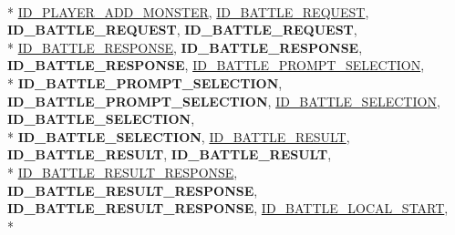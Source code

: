 \begin{DoxyCompactItemize}
\\*
\hyperlink{namespace_champ_net_plugin_a2ade5cfa7cf6c25ab7236c6b54a57821ad42c079bb7459dbaf419eeb2e845f3e2}{I\-D\-\_\-\-P\-L\-A\-Y\-E\-R\-\_\-\-A\-D\-D\-\_\-\-M\-O\-N\-S\-T\-E\-R}, 
\hyperlink{namespace_champ_net_plugin_a2ade5cfa7cf6c25ab7236c6b54a57821a1099c58a5b9ad43616e67c5865ce539a}{I\-D\-\_\-\-B\-A\-T\-T\-L\-E\-\_\-\-R\-E\-Q\-U\-E\-S\-T}, 
{\bfseries I\-D\-\_\-\-B\-A\-T\-T\-L\-E\-\_\-\-R\-E\-Q\-U\-E\-S\-T}, 
{\bfseries I\-D\-\_\-\-B\-A\-T\-T\-L\-E\-\_\-\-R\-E\-Q\-U\-E\-S\-T}, 
\\*
\hyperlink{namespace_champ_net_plugin_a2ade5cfa7cf6c25ab7236c6b54a57821a4d61a30352b41b284f20eeb6d46d0b18}{I\-D\-\_\-\-B\-A\-T\-T\-L\-E\-\_\-\-R\-E\-S\-P\-O\-N\-S\-E}, 
{\bfseries I\-D\-\_\-\-B\-A\-T\-T\-L\-E\-\_\-\-R\-E\-S\-P\-O\-N\-S\-E}, 
{\bfseries I\-D\-\_\-\-B\-A\-T\-T\-L\-E\-\_\-\-R\-E\-S\-P\-O\-N\-S\-E}, 
\hyperlink{namespace_champ_net_plugin_a2ade5cfa7cf6c25ab7236c6b54a57821a1ce06c939b64517c251a1cc36168837f}{I\-D\-\_\-\-B\-A\-T\-T\-L\-E\-\_\-\-P\-R\-O\-M\-P\-T\-\_\-\-S\-E\-L\-E\-C\-T\-I\-O\-N}, 
\\*
{\bfseries I\-D\-\_\-\-B\-A\-T\-T\-L\-E\-\_\-\-P\-R\-O\-M\-P\-T\-\_\-\-S\-E\-L\-E\-C\-T\-I\-O\-N}, 
{\bfseries I\-D\-\_\-\-B\-A\-T\-T\-L\-E\-\_\-\-P\-R\-O\-M\-P\-T\-\_\-\-S\-E\-L\-E\-C\-T\-I\-O\-N}, 
\hyperlink{namespace_champ_net_plugin_a2ade5cfa7cf6c25ab7236c6b54a57821aaf35bd9b65c9b7d548147fbd85717bf9}{I\-D\-\_\-\-B\-A\-T\-T\-L\-E\-\_\-\-S\-E\-L\-E\-C\-T\-I\-O\-N}, 
{\bfseries I\-D\-\_\-\-B\-A\-T\-T\-L\-E\-\_\-\-S\-E\-L\-E\-C\-T\-I\-O\-N}, 
\\*
{\bfseries I\-D\-\_\-\-B\-A\-T\-T\-L\-E\-\_\-\-S\-E\-L\-E\-C\-T\-I\-O\-N}, 
\hyperlink{namespace_champ_net_plugin_a2ade5cfa7cf6c25ab7236c6b54a57821a744cf8458d36d27da738fcf6ba76001c}{I\-D\-\_\-\-B\-A\-T\-T\-L\-E\-\_\-\-R\-E\-S\-U\-L\-T}, 
{\bfseries I\-D\-\_\-\-B\-A\-T\-T\-L\-E\-\_\-\-R\-E\-S\-U\-L\-T}, 
{\bfseries I\-D\-\_\-\-B\-A\-T\-T\-L\-E\-\_\-\-R\-E\-S\-U\-L\-T}, 
\\*
\hyperlink{namespace_champ_net_plugin_a2ade5cfa7cf6c25ab7236c6b54a57821a0400430dae2bfdb56c3c5be84d5fc2b1}{I\-D\-\_\-\-B\-A\-T\-T\-L\-E\-\_\-\-R\-E\-S\-U\-L\-T\-\_\-\-R\-E\-S\-P\-O\-N\-S\-E}, 
{\bfseries I\-D\-\_\-\-B\-A\-T\-T\-L\-E\-\_\-\-R\-E\-S\-U\-L\-T\-\_\-\-R\-E\-S\-P\-O\-N\-S\-E}, 
{\bfseries I\-D\-\_\-\-B\-A\-T\-T\-L\-E\-\_\-\-R\-E\-S\-U\-L\-T\-\_\-\-R\-E\-S\-P\-O\-N\-S\-E}, 
\hyperlink{namespace_champ_net_plugin_a2ade5cfa7cf6c25ab7236c6b54a57821ab54454887b51006a69a632ca6a13aab6}{I\-D\-\_\-\-B\-A\-T\-T\-L\-E\-\_\-\-L\-O\-C\-A\-L\-\_\-\-S\-T\-A\-R\-T}, 
\\*

\end{DoxyCompactItemize}
